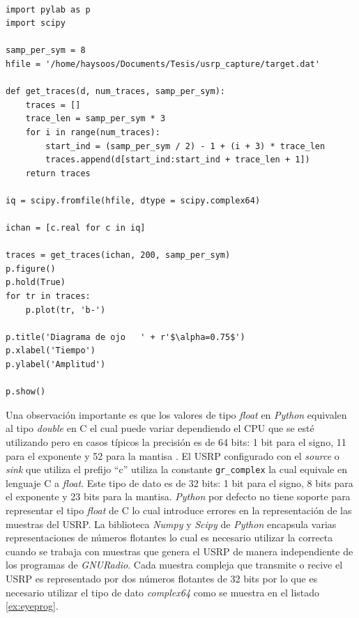 \begin{lstlisting}[float, label=ex:eyeprog, caption={Programa que genera el diagrama de ojo a partir
de muestras tomadas del USRP.}, breaklines=true]

import pylab as p
import scipy

samp_per_sym = 8
hfile = '/home/haysoos/Documents/Tesis/usrp_capture/target.dat'

def get_traces(d, num_traces, samp_per_sym):
    traces = []
    trace_len = samp_per_sym * 3
    for i in range(num_traces):
        start_ind = (samp_per_sym / 2) - 1 + (i + 3) * trace_len
        traces.append(d[start_ind:start_ind + trace_len + 1])
    return traces
    
iq = scipy.fromfile(hfile, dtype = scipy.complex64)

ichan = [c.real for c in iq]

traces = get_traces(ichan, 200, samp_per_sym)
p.figure()
p.hold(True)
for tr in traces:
    p.plot(tr, 'b-')

p.title('Diagrama de ojo   ' + r'$\alpha=0.75$')
p.xlabel('Tiempo')
p.ylabel('Amplitud')

p.show()
\end{lstlisting}

Una observaci\'on importante es que los valores de tipo \emph{float} en \emph{Python} equivalen al tipo
\emph{double} en C el cual puede variar dependiendo el CPU que se est\'e utilizando pero en casos
t\'ipicos la precisi\'on es de 64 bits: 1 bit para el signo, 11 para el exponente y 52 para la mantisa
\cite{python}. El USRP configurado con el \emph{source} o \emph{sink} que utiliza el prefijo ``c''
utiliza la constante \verb|gr_complex| la cual equivale en lenguaje C a \emph{float}. Este tipo de
dato es de 32 bits: 1 bit para el signo, 8 bits para el exponente y 23 bits para la mantisa. \emph{Python}
por defecto no tiene soporte para representar el tipo \emph{float} de C lo cual introduce errores en la
representaci\'on de las muestras del USRP. La biblioteca \emph{Numpy} y \emph{Scipy} de \emph{Python} encapsula
varias representaciones de n\'umeros flotantes \cite{scipy} lo cual es necesario utilizar la correcta
cuando se trabaja con muestras que genera el USRP de manera independiente de los programas de
\emph{GNURadio}. Cada muestra compleja que transmite o recive el USRP es representado por dos
n\'umeros flotantes de 32 bits por lo que es necesario utilizar el tipo de dato \emph{complex64} como
se muestra en el listado \ref{ex:eyeprog}.

